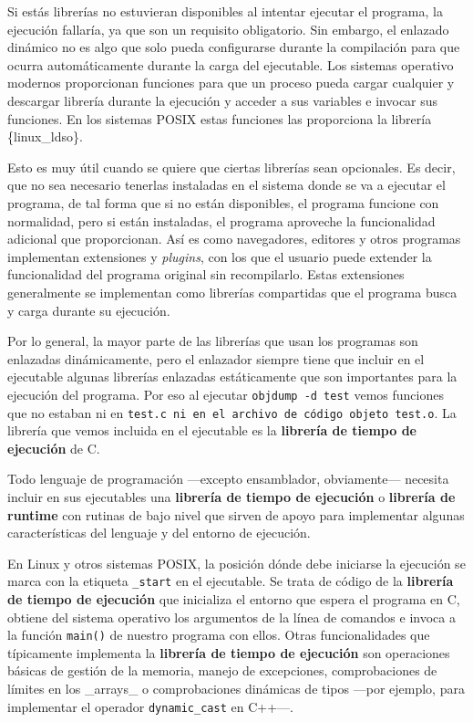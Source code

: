 Si estás librerías no estuvieran disponibles al intentar ejecutar el
programa, la ejecución fallaría, ya que son un requisito obligatorio.
Sin embargo, el enlazado dinámico no es algo que solo pueda configurarse
durante la compilación para que ocurra automáticamente durante la carga
del ejecutable. Los sistemas operativo modernos proporcionan funciones
para que un proceso pueda cargar cualquier y descargar librería durante
la ejecución y acceder a sus variables e invocar sus funciones. En los
sistemas POSIX estas funciones las proporciona la librería
\{linux\_ldso\}.

Esto es muy útil cuando se quiere que ciertas librerías sean opcionales.
Es decir, que no sea necesario tenerlas instaladas en el sistema donde
se va a ejecutar el programa, de tal forma que si no están disponibles,
el programa funcione con normalidad, pero si están instaladas, el
programa aproveche la funcionalidad adicional que proporcionan. Así es
como navegadores, editores y otros programas implementan extensiones y
\emph{plugins}, con los que el usuario puede extender la funcionalidad
del programa original sin recompilarlo. Estas extensiones generalmente
se implementan como librerías compartidas que el programa busca y carga
durante su ejecución.

Por lo general, la mayor parte de las librerías que usan los programas
son enlazadas dinámicamente, pero el enlazador siempre tiene que incluir
en el ejecutable algunas librerías enlazadas estáticamente que son
importantes para la ejecución del programa. Por eso al ejecutar
\texttt{objdump\ -d\ test} vemos funciones que no estaban ni en
\texttt{test.c\ ni\ en\ el\ archivo\ de\ código\ objeto\ \textasciigrave{}test.o}.
La librería que vemos incluida en el ejecutable es la \textbf{librería
de tiempo de ejecución} de C.

Todo lenguaje de programación ---excepto ensamblador, obviamente---
necesita incluir en sus ejecutables una \textbf{librería de tiempo de
ejecución}{} o \textbf{librería de runtime}{} con rutinas de bajo nivel
que sirven de apoyo para implementar algunas características del
lenguaje y del entorno de ejecución.

En Linux y otros sistemas POSIX, la posición dónde debe iniciarse la
ejecución se marca con la etiqueta \texttt{\_start} en el ejecutable. Se
trata de código de la \textbf{librería de tiempo de ejecución} que
inicializa el entorno que espera el programa en C, obtiene del sistema
operativo los argumentos de la línea de comandos e invoca a la función
\texttt{main()} de nuestro programa con ellos. Otras funcionalidades que
típicamente implementa la \textbf{librería de tiempo de ejecución} son
operaciones básicas de gestión de la memoria, manejo de excepciones,
comprobaciones de límites en los \_arrays\_ o comprobaciones dinámicas
de tipos ---por ejemplo, para implementar el operador
\texttt{dynamic\_cast} en C++---.

